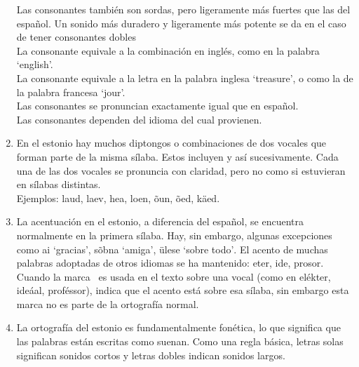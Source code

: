 \begin{enumerate}
 	Las consonantes  también son sordas, pero ligeramente más fuertes que las del español. Un sonido más duradero y ligeramente más potente se da en el caso de tener consonantes dobles \\

 	La consonante  equivale a la combinación  en inglés, como en la palabra `english'.\\

 	La consonante  equivale a la letra  en la palabra inglesa `treasure', o como la  de la palabra francesa `jour'.\\

 	Las consonantes  se pronuncian exactamente igual que en español.\\

 	Las consonantes  dependen del idioma del cual provienen.\\

 	\item En el estonio hay muchos diptongos o combinaciones de dos vocales que forman parte de la misma sílaba. Estos incluyen  y así sucesivamente. Cada una de las dos vocales se pronuncia con claridad, pero no como si estuvieran en sílabas distintas.\\

 	Ejemplos: laud, laev, hea, loen, õun, õed, käed.\\

 	\item La acentuación en el estonio, a diferencia del español, se encuentra normalmente en la primera sílaba. Hay, sin embargo, algunas excepciones como \foreignlanguage{estonian}{ai `gracias', sõbna `amiga', ülese `sobre todo'}. El acento de muchas palabras adoptadas de otros idiomas se ha mantenido: eter, ide, prosor. Cuando la marca \textasciiacute\ es usada en el texto sobre una vocal (como en elékter, ideáal, proféssor), indica que el acento está sobre esa sílaba, sin embargo esta marca no es parte de la ortografía normal.\\

 	\item La ortografía del estonio es fundamentalmente fonética, lo que significa que las palabras están escritas como suenan. Como una regla básica, letras solas significan sonidos cortos y letras dobles indican sonidos largos.\\


\end{enumerate}
